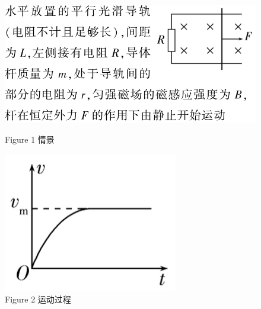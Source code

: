 \documentclass{article}
\begin{document}
\begin{enumerate}[label = (\arabic*{})]
          \begin{figure}[H]
              \begin{minipage}{0.6\textwidth}
                  \centering
                  \includegraphics[width = \textwidth]{pictures/6.png}
                  \caption*{Figure 1 情景}
              \end{minipage}
              \hfill
              \begin{minipage}{0.35\textwidth}
                  \centering
                  \includegraphics[width = \textwidth]{pictures/7.png}
                  \caption*{Figure 2 运动过程}
              \end{minipage}
          \end{figure}
\end{enumerate}

\vspace{2em}
\end{document}
